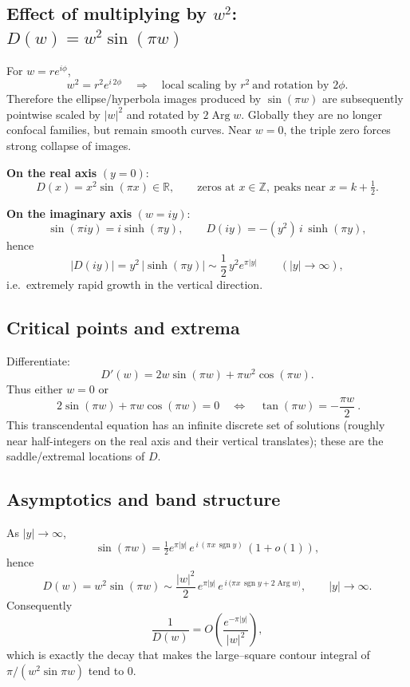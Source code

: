 \documentclass[12pt,a4paper]{article}
\DeclareMathOperator{\sgn}{sgn}
\DeclareMathOperator{\Arg}{Arg}
\begin{document}
\subsection*{Effect of multiplying by \(w^{2}\): \(D(w)=w^{2}\sin(\pi w)\)}

For \(w=re^{i\phi}\),
\[
w^{2}=r^{2}e^{i\,2\phi}\quad\Rightarrow\quad \text{local scaling by }r^{2}\ \text{and rotation by }2\phi.
\]
Therefore the ellipse/hyperbola images produced by \(\sin(\pi w)\) are subsequently pointwise scaled by \(|w|^{2}\) and rotated by \(2\Arg w\). Globally they are no longer confocal families, but remain smooth curves. Near \(w=0\), the triple zero forces strong collapse of images.

\medskip
\textbf{On the real axis} \((y=0)\):
\[
D(x)=x^{2}\sin(\pi x)\in\mathbb{R},\qquad \text{zeros at }x\in\mathbb{Z},\ \text{peaks near }x=k+\tfrac12.
\]

\textbf{On the imaginary axis} \((w=iy)\):
\[
\sin(\pi i y)=i\sinh(\pi y),\qquad D(iy)=-(y^{2})\,i\,\sinh(\pi y),
\]
hence
\[
|D(iy)|=y^{2}\,|\sinh(\pi y)|\sim \frac12\,y^{2}e^{\pi|y|}\qquad(|y|\to\infty),
\]
i.e.\ extremely rapid growth in the vertical direction.

\subsection*{Critical points and extrema}

Differentiate:
\[
D'(w)=2w\sin(\pi w)+\pi w^{2}\cos(\pi w).
\]
Thus either \(w=0\) or
\[
\boxed{\ 2\sin(\pi w)+\pi w\cos(\pi w)=0\quad\Longleftrightarrow\quad \tan(\pi w)=-\frac{\pi w}{2}\ }.
\]
This transcendental equation has an infinite discrete set of solutions (roughly near half-integers on the real axis and their vertical translates); these are the saddle/extremal locations of \(D\).

\subsection*{Asymptotics and band structure}

As \(|y|\to\infty\),
\[
\sin(\pi w)=\tfrac12 e^{\pi|y|}\,e^{\,i\,(\pi x\,\sgn y)}\,(1+o(1)),
\]
hence
\[
D(w)=w^{2}\sin(\pi w)\sim \frac{|w|^{2}}{2}\,e^{\pi|y|}\,e^{\,i\,\big(\pi x\,\sgn y+2\Arg w\big)},
\qquad |y|\to\infty.
\]
Consequently
\[
\frac{1}{D(w)}=O\!\left(\frac{e^{-\pi|y|}}{|w|^{2}}\right),
\]
which is exactly the decay that makes the large–square contour integral of \(\pi/(w^{2}\sin\pi w)\) tend to \(0\).
\end{document}
